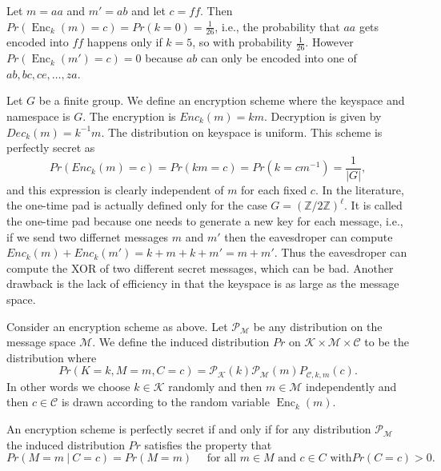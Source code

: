 \documentclass[twoside, a4paper, 10pt]{amsart}
\begin{document}
\begin{eg} Let $m = aa$ and $m' = ab$ and let $c = ff$. Then $Pr(\operatorname{Enc}_k(m) = c) = Pr( k = 0) = \frac{1}{26}$, i.e., the probability that $aa$ gets encoded into $ff$ happens only if $k = 5$, so with probability $\frac{1}{26}$. However $Pr(\operatorname{Enc}_k(m') = c) = 0$ because $ab$ can only be encoded into one of $ab, bc, ce, \ldots, za$.

\end{eg}

\begin{eg} Let $G$ be a finite group. We define an encryption scheme where the keyspace and namespace is $G$. The encryption is $Enc_k(m) = km$. Decryption is given by $Dec_k(m) = k^{-1}m$. The distribution on keyspace is uniform. This scheme is perfectly secret as $$Pr(Enc_k(m) = c) = Pr(km = c) = Pr(k = cm^{-1}) = \frac{1}{|G|},$$ and this expression is clearly independent of $m$ for each fixed $c$. In the literature, the one-time pad is actually defined only for the case $G = (\mathbb{Z}/2\mathbb{Z})^{\ell}$. It is called the one-time pad because one needs to generate a new key for each message, i.e., if we send two differnet messages $m$ and $m'$ then the eavesdroper can compute $Enc_k(m) + Enc_k(m') = k + m + k+ m' = m+m'$. Thus the eavesdroper can compute the XOR of two different secret messages, which can be bad. Another drawback is the lack of efficiency in that the keyspace is as large as the message space.

\end{eg}

\begin{mydef} Consider an encryption scheme as above. Let $\mathcal{P}_{\mathcal{M}}$ be any distribution on the message space $\mathcal{M}$. We define the induced distribution $Pr$ on $\mathcal{K} \times \mathcal{M} \times \mathcal{C}$ to be the distribution where $$Pr(K = k, M=m, C=c) = \mathcal{P}_{\mathcal{K}}(k) \mathcal{P}_{\mathcal{M}}(m) P_{\mathcal{C},k,m}(c).$$ In other words we choose $k \in \mathcal{K}$ randomly and then $m \in \mathcal{M}$ independently  and then $c \in \mathcal{C}$ is drawn according to the random variable $\operatorname{Enc}_k(m)$.

\end{mydef}

\begin{prop} An encryption scheme is perfectly secret if and only if for any distribution $\mathcal{P}_{\mathcal{M}}$ the induced distribution $Pr$ satisfies the property that $$Pr(M=m ~|~ C=c) = Pr(M = m) \quad \text{ for all } m \in M \text{ and } c \in C \text{ with} Pr(C=c) >0. $$

\end{prop}
\end{document}
